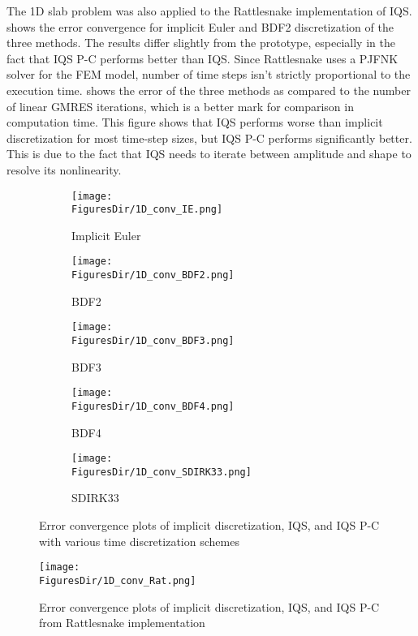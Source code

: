 The 1D slab problem was also applied to the Rattlesnake implementation of IQS.   shows the error convergence for implicit Euler and BDF2 discretization of the three methods.  The results differ slightly from the prototype, especially in the fact that IQS P-C performs better than IQS.  Since Rattlesnake uses a PJFNK solver for the FEM model, number of time steps isn't strictly proportional to the execution time.   shows the error of the three methods as compared to the number of linear GMRES iterations, which is a better mark for comparison in computation time.  This figure shows that IQS performs worse than implicit discretization for most time-step sizes, but IQS P-C performs significantly better.  This is due to the fact that IQS needs to iterate between amplitude and shape to resolve its nonlinearity.

\begin{figure}[!htbp]
\centering
\begin{subfigure}[b]{0.49\textwidth}
\centering
\texttt{[image: \\FiguresDir/1D\_conv\_IE.png]}
\caption{Implicit Euler}
\end{subfigure}
\begin{subfigure}[b]{0.49\textwidth}
\centering
\texttt{[image: \\FiguresDir/1D\_conv\_BDF2.png]}
\caption{BDF2}
\end{subfigure}
\begin{subfigure}[b]{0.49\textwidth}
\centering
\texttt{[image: \\FiguresDir/1D\_conv\_BDF3.png]}
\caption{BDF3}
\end{subfigure}
\begin{subfigure}[b]{0.49\textwidth}
\centering
\texttt{[image: \\FiguresDir/1D\_conv\_BDF4.png]}
\caption{BDF4}
\end{subfigure}
\begin{subfigure}[b]{0.49\textwidth}
\centering
\texttt{[image: \\FiguresDir/1D\_conv\_SDIRK33.png]}
\caption{SDIRK33}
\end{subfigure}
\caption{Error convergence plots of implicit discretization, IQS, and IQS P-C with various time discretization schemes}
\label{fig:1D_conv}
\end{figure}

\begin{figure}[!htbp]
\begin{center}
\texttt{[image: \\FiguresDir/1D\_conv\_Rat.png]}
\caption{Error convergence plots of implicit discretization, IQS, and IQS P-C from Rattlesnake implementation}
\label{fig:1D_conv_Rat}
\end{center}
\end{figure}

